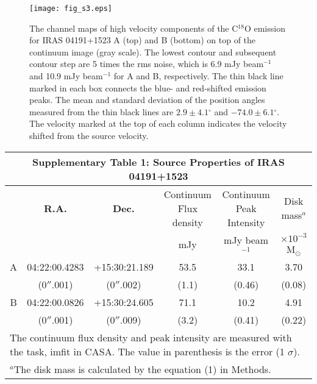 \documentclass{nature}
\newcommand{\msun}{\mbox{M$_\odot$}}%
\newcommand{\degree}{\mbox{$^\circ$}}
\begin{document}
\begin{figure*}
\label{fig:s3}
\texttt{[image: fig\_s3.eps]}
\caption{ The channel maps of high velocity components of the C$^{18}$O emission 
for IRAS 04191+1523 A (top) and B (bottom) on top of the continuum image (gray scale).
The lowest contour and subsequent contour step are 5 times the rms noise, which is 6.9 mJy beam$^{-1}$ 
and 10.9 mJy beam$^{-1}$ for A and B, respectively.
The thin black line marked in each box connects the blue- and red-shifted emission peaks. 
The mean and standard deviation of the position angles measured from the thin black lines are $2.9\pm4.1\degree$ 
and $-74.0\pm6.1\degree$.
The velocity marked at the top of each column indicates the velocity shifted from the source
velocity. }
\end{figure*}


\clearpage


\begin{center}
\begin{tabular}{cccccc}
\multicolumn{6}{c}{\bf Supplementary Table 1: Source Properties of IRAS 04191+1523}
\label{tb:gauss_cont}
\\\hline
{} &
{\bf R.A.} &
{\bf Dec.} &
{Continuum Flux density} &
{Continuum Peak Intensity} &
{Disk mass$^a$} \\ %
{} &
{} &
{} &
{mJy} &
{mJy beam$^{-1}$} &
{$\times 10^{-3}$ \msun}
\\\hline\hline
 A &  04:22:00.4283  & +15:30:21.189 &  53.5 & 33.1  & 3.70  \\
   & (0$''$.001)     & (0$''$.002)   & (1.1)& (0.46)& (0.08) \\
B  &  04:22:00.0826  & +15:30:24.605 &  71.1 & 10.2 &  4.91 \\
   & (0$''$.001)     & (0$''$.009)   & (3.2)& (0.41)& (0.22)\\
\hline
\multicolumn{6}{l}{\footnotesize The continuum flux density and peak intensity are measured with the task, imfit in CASA. 
The value in parenthesis is the error (1 $\sigma$).} \\
\multicolumn{6}{l}{\footnotesize $^a$The disk mass is calculated by the equation (1) in Methods.}\\
\end{tabular}
\end{center}
\end{document}
